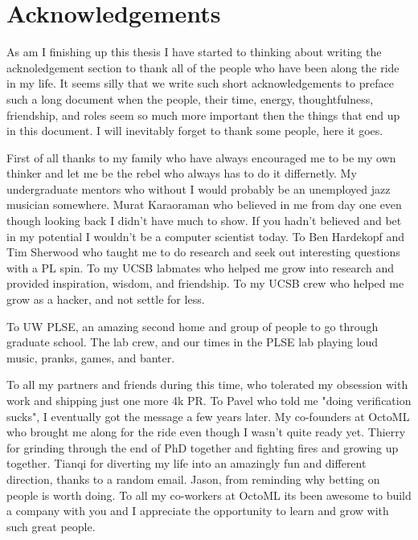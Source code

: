 \section{Acknowledgements}

As am I finishing up this thesis I have started to thinking about writing the
    acknoledgement section to thank all of the people who have been along the ride
    in my life.
It seems silly that we write such short acknowledgements to preface such a long
    document when the people, their time, energy, thoughtfulness, friendship,
    and roles seem so much more important then the things that end up in this
    document.
I will inevitably forget to thank some people, here it goes.

First of all thanks to my family who have always encouraged
    me to be my own thinker and let me be the rebel who
    always has to do it differnetly.
My undergraduate mentors who without I would probably be an unemployed
    jazz musician somewhere.
Murat Karaoraman who believed in me from day one even though looking
    back I didn't have much to show.
If you hadn't believed and bet in my potential I wouldn't be a computer scientist today.
To Ben Hardekopf and Tim Sherwood who taught me to do research
    and seek out interesting questions with a PL spin.
To my UCSB labmates who helped me grow into research and
    provided inspiration, wisdom, and friendship.
To my UCSB crew who helped me grow as a hacker, and
    not settle for less.

To UW PLSE, an amazing second home and group of people to
    go through graduate school.
The lab crew, and our times in the PLSE lab playing loud
    music, pranks, games, and banter.



To all my partners and friends during this time, who tolerated
    my obsession with work and shipping just one more 4k PR.
To Pavel who told me "doing verification sucks",
    I eventually got the message a few years later.
My co-founders at OctoML who brought me along for the ride
    even though I wasn't quite ready yet.
Thierry for grinding through the end of PhD together and
    fighting fires and growing up together.
Tianqi for diverting my life into an amazingly fun and
    different direction, thanks to a random email.
Jason, from reminding why betting on people is worth doing.
To all my co-workers at OctoML its been awesome to build
    a company with you and I appreciate the opportunity to
    learn and grow with such great people.

